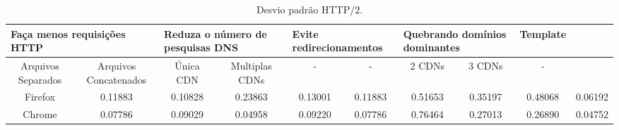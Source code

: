 \begin{table}[h]
	\centering
	\caption{Desvio padrão HTTP/2.}
	\label{desviopadraohttp2}
	\begin{tabular}{cccccccccc}
		\hline
        \multicolumn{2}{l}{\textbf{Faça menos requisições HTTP}} & \multicolumn{2}{l}{\textbf{Reduza o número de pesquisas DNS}} & \multicolumn{2}{l}{\textbf{Evite redirecionamentos}} & \multicolumn{2}{l}{\textbf{Quebrando domínios dominantes}} & \textbf{Template} \\
		\hline
        Arquivos Separados & Arquivos Concatenados & Única CDN & Multiplas CDNs & - & - & 2 CDNs & 3 CDNs & - \\
		Firefox & 0.11883 & 0.10828 & 0.23863 & 0.13001 & 0.11883 & 0.51653 & 0.35197 & 0.48068 & 0.06192  \\
		Chrome & 0.07786 & 0.09029 & 0.04958 & 0.09220 & 0.07786 & 0.76464 & 0.27013 & 0.26890 & 0.04752  \\
		\hline
	\end{tabular}
\end{table}